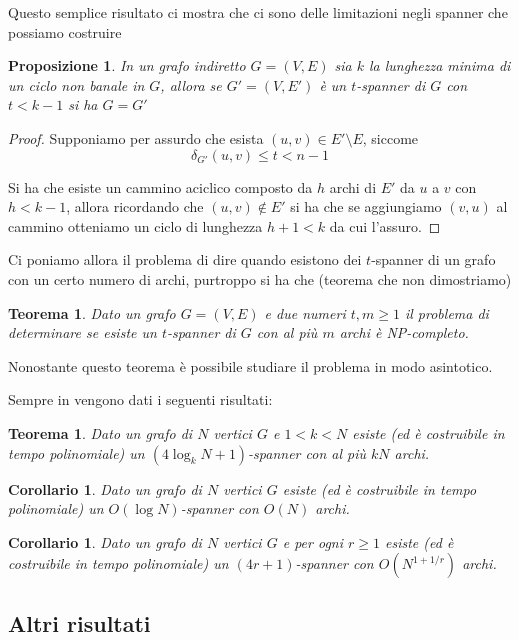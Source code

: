 \documentclass[a4paper,10pt]{amsbook}
\newcounter{counter1}
\theoremstyle{plain}
\newtheorem{myteo}[counter1]{Teorema}
\newtheorem{mypro}[counter1]{Proposizione}
\newtheorem{mycor}[counter1]{Corollario}
\theoremstyle{definition}
\theoremstyle{remark}
\newcommand{\pa}[1]{\left(#1\right)}
\begin{document}
Questo semplice risultato ci mostra che ci sono delle limitazioni
negli spanner che possiamo costruire
\begin{mypro}
  In un grafo indiretto $G = (V,E)$ sia $k$ la lunghezza minima di un
  ciclo non banale in $G$, allora se $G' = (V,E')$ \`e un $t$-spanner
  di $G$ con $t < k-1$ si ha $G = G'$
\end{mypro}
\begin{proof}
  Supponiamo per assurdo che esista $(u,v) \in E' \setminus E$,
  siccome
  \[ \delta_{G'} (u,v) \le t < n -1 \] 

  Si ha che esiste un cammino aciclico composto da $h$ archi di $E'$
  da $u$ a $v$ con $h<k-1$, allora ricordando che $(u,v) \not\in E'$
  si ha che se aggiungiamo $(v,u)$ al cammino otteniamo un ciclo di
  lunghezza $h+1 < k$ da cui l'assuro.
\end{proof}

Ci poniamo allora il problema di dire quando esistono dei $t$-spanner
di un grafo con un certo numero di archi, purtroppo si ha che (teorema
che non dimostriamo)
\begin{myteo}
  Dato un grafo $G = (V,E)$ e due numeri $t,m\ge 1$ il problema di
  determinare se esiste un $t$-spanner di $G$ con al pi\`u $m$ archi
  \`e NP-completo.
\end{myteo}

Nonostante questo teorema \`e possibile studiare il problema in modo
asintotico.

Sempre in \cite{graphspanners} vengono dati i seguenti risultati:

\begin{myteo}
  Dato un grafo di $N$ vertici $G$ e $1<k<N$ esiste (ed \`e
  costruibile in tempo polinomiale) un $(4\log _k N +1)$-spanner con
  al pi\`u $kN$ archi.
\end{myteo}

\begin{mycor}
  Dato un grafo di $N$ vertici $G$ esiste (ed \`e costruibile in tempo
  polinomiale) un $O\pa{\log N}$-spanner con $O(N)$ archi.
\end{mycor}

\begin{mycor}
  Dato un grafo di $N$ vertici $G$ e per ogni $r\ge 1$ esiste (ed \`e
  costruibile in tempo polinomiale) un $(4r+1)$-spanner con
  $O(N^{1+1/r})$ archi.
\end{mycor}


\subsection{Altri risultati}
\end{document}
